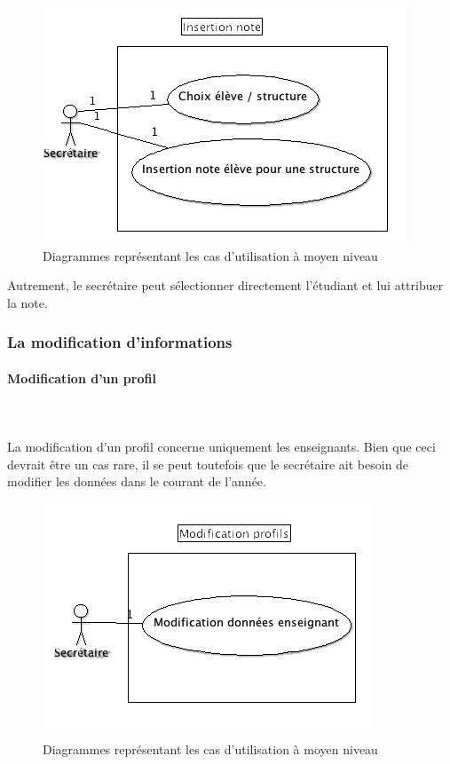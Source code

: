 \documentclass[letter, 11pt] {article}
\begin{document}
			\begin{figure}[!h]
				\centering
					\includegraphics[scale = 0.6]{../UseCase/UseCaseMoyenNiveau/InsertionNote.png}
				\caption{Diagrammes représentant les cas d'utilisation à moyen niveau}
			\end{figure}
			
			Autrement, le secrétaire peut sélectionner directement l'étudiant et lui attribuer la note.
			
			
		\subsubsection{La modification d'informations}
		
			\paragraph{Modification d'un profil}~	\paragraph{ }La modification d'un profil concerne uniquement les enseignants. Bien que ceci devrait être un cas rare, il se peut toutefois que le secrétaire ait besoin de modifier les données dans le courant de l'année.
			
			\begin{figure}[!h]
				\centering
					\includegraphics[scale = 0.5]{../UseCase/UseCaseMoyenNiveau/ModificationProfil.png}
				\caption{Diagrammes représentant les cas d'utilisation à moyen niveau}
			\end{figure}
			
\end{document}
